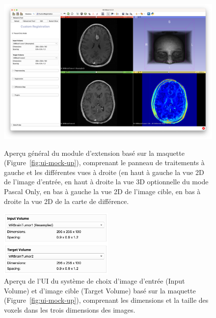\documentclass{article}
\begin{document}
{{{            \begin{figure}[!p]
                \begin{minipage}{\textwidth}
                    \centering
                    \includegraphics[width=\textwidth]{images/general-view.png}
                    \caption{Aperçu général du module d'extension basé sur la maquette (Figure~\ref{fig:ui-mock-up}), comprenant le panneau de traitements à gauche et les différentes vues à droite (en haut à gauche la vue 2D de l'image d'entrée, en haut à droite la vue 3D optionnelle du mode Pascal Only, en bas à gauche la vue 2D de l'image cible, en bas à droite la vue 2D de la carte de différence.}
                    \label{fig:general-view}
                \end{minipage}

                \bigskip\bigskip\bigskip

                \begin{minipage}{\textwidth}
                    \centering
                    \includegraphics[width=0.5\textwidth]{images/input-target-ui.png}
                    \caption{Aperçu de l'UI du système de choix d'image d'entrée (Input Volume) et d'image cible (Target Volume) basé sur la maquette (Figure~\ref{fig:ui-mock-up}), comprenant les dimensions et la taille des voxels dans les trois dimensions des images.}
                    \label{fig:input-target-ui}
                \end{minipage}
            \end{figure}

}}}
\end{document}
